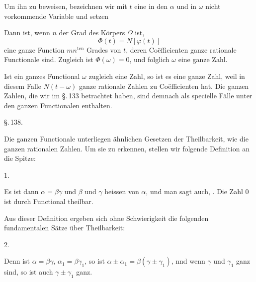
Um ihn zu beweisen, bezeichnen wir mit $t$ eine in den $\alpha$ und in $\omega$ nicht vorkommende Variable und setzen


Dann ist, wenn $n$ der Grad des Körpers $\Omega$ ist,
\[
\Phi(t) = N[\varphi(t)]
\]
eine ganze Function $mn^{\text{ten}}$ Grades von $t$, deren Coëfficienten ganze rationale Functionale sind. Zugleich ist $\Phi(\omega) = 0$, und folglich $\omega$ eine ganze Zahl.


Ist ein ganzes Functional $\omega$ zugleich eine Zahl, so ist es eine ganze Zahl, weil in diesem Falle $N(t-\omega)$ ganze rationale Zahlen zu Coëfficienten hat. Die ganzen Zahlen, die wir im \S.\,133 betrachtet haben, sind demnach als specielle Fälle unter den ganzen Functionalen enthalten.

\S.\,138.


Die ganzen Functionale unterliegen ähnlichen Gesetzen der Theilbarkeit, wie die ganzen rationalen Zahlen. Um sie zu erkennen, stellen wir folgende Definition an die Spitze:

1. 

Es ist dann $\alpha=\beta\gamma$ und $\beta$ und $\gamma$ heissen  von $\alpha$, und man sagt auch, . Die Zahl 0 ist durch  Functional theilbar.

Aus dieser Definition ergeben sich ohne Schwierigkeit die folgenden fundamentalen Sätze über Theilbarkeit:

2. 

Denn ist $\alpha=\beta\gamma$, $\alpha_1=\beta\gamma_1$, so ist $\alpha\pm\alpha_1=\beta(\gamma\pm\gamma_1)$, nnd wenn $\gamma$ und $\gamma_1$ ganz sind, so ist auch $\gamma\pm\gamma_1$ ganz. %

